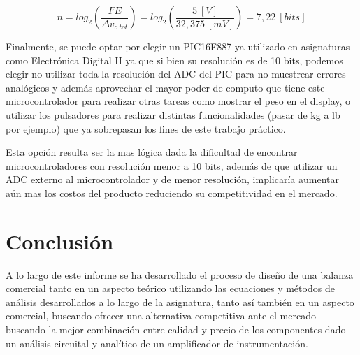 \documentclass[12pt,a4paper]{article}
\begin{document}
\begin{equation}
    \label{eq_41}
    n = log_{2}\left(\frac{FE}{\Delta v_{o \ tot}}\right) = log_{2}\left(\frac{5 \ [V]}{32,375 \ [mV]}\right) = 7,22 \ [bits]
\end{equation}

Finalmente, se puede optar por elegir un PIC16F887 ya utilizado en asignaturas como Electrónica Digital II ya que si bien su resolución es de 10 bits, podemos elegir no utilizar toda la resolución del ADC del PIC para no muestrear errores analógicos y además aprovechar el mayor poder de computo que tiene este microcontrolador para realizar otras tareas como mostrar el peso en el display, o utilizar los pulsadores para realizar distintas funcionalidades (pasar de kg a lb por ejemplo) que ya sobrepasan los fines de este trabajo práctico.

Esta opción resulta ser la mas lógica dada la dificultad de encontrar microcontroladores con resolución menor a 10 bits, además de que utilizar un ADC externo al microcontrolador y de menor resolución, implicaría aumentar aún mas los costos del producto reduciendo su competitividad en el mercado.



\section{Conclusión}
A lo largo de este informe se ha desarrollado el proceso de diseño de una balanza comercial tanto en un aspecto teórico utilizando las ecuaciones y métodos de análisis desarrollados a lo largo de la asignatura, tanto así también en un aspecto comercial, buscando ofrecer una alternativa competitiva ante el mercado buscando la mejor combinación entre calidad y precio de los componentes dado un análisis circuital y analítico de un amplificador de instrumentación.
\\
\end{document}
